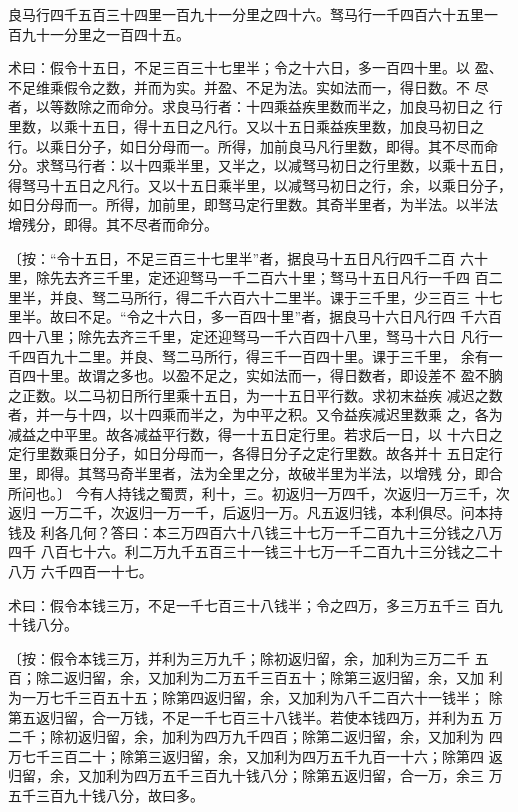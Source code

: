 \documentclass[12pt,UTF8]{ctexbook}
\begin{document}
良马行四千五百三十四里一百九十一分里之四十六。驽马行一千四百六十五里一 百九十一分里之一百四十五。

术曰：假令十五日，不足三百三十七里半；令之十六日，多一百四十里。以 盈、不足维乘假令之数，并而为实。并盈、不足为法。实如法而一，得日数。不 尽者，以等数除之而命分。求良马行者：十四乘益疾里数而半之，加良马初日之 行里数，以乘十五日，得十五日之凡行。又以十五日乘益疾里数，加良马初日之 行。以乘日分子，如日分母而一。所得，加前良马凡行里数，即得。其不尽而命 分。求驽马行者：以十四乘半里，又半之，以减驽马初日之行里数，以乘十五日， 得驽马十五日之凡行。又以十五日乘半里，以减驽马初日之行，余，以乘日分子， 如日分母而一。所得，加前里，即驽马定行里数。其奇半里者，为半法。以半法 增残分，即得。其不尽者而命分。

〔按：“令十五日，不足三百三十七里半”者，据良马十五日凡行四千二百 六十里，除先去齐三千里，定还迎驽马一千二百六十里；驽马十五日凡行一千四 百二里半，并良、驽二马所行，得二千六百六十二里半。课于三千里，少三百三 十七里半。故曰不足。“令之十六日，多一百四十里”者，据良马十六日凡行四 千六百四十八里；除先去齐三千里，定还迎驽马一千六百四十八里，驽马十六日 凡行一千四百九十二里。并良、驽二马所行，得三千一百四十里。课于三千里， 余有一百四十里。故谓之多也。以盈不足之，实如法而一，得日数者，即设差不 盈不朒之正数。以二马初日所行里乘十五日，为一十五日平行数。求初末益疾 减迟之数者，并一与十四，以十四乘而半之，为中平之积。又令益疾减迟里数乘 之，各为减益之中平里。故各减益平行数，得一十五日定行里。若求后一日，以 十六日之定行里数乘日分子，如日分母而一，各得日分子之定行里数。故各并十 五日定行里，即得。其驽马奇半里者，法为全里之分，故破半里为半法，以增残 分，即合所问也。〕 今有人持钱之蜀贾，利十，三。初返归一万四千，次返归一万三千，次返归 一万二千，次返归一万一千，后返归一万。凡五返归钱，本利俱尽。问本持钱及 利各几何？答曰：本三万四百六十八钱三十七万一千二百九十三分钱之八万四千 八百七十六。利二万九千五百三十一钱三十七万一千二百九十三分钱之二十八万 六千四百一十七。

术曰：假令本钱三万，不足一千七百三十八钱半；令之四万，多三万五千三 百九十钱八分。

〔按：假令本钱三万，并利为三万九千；除初返归留，余，加利为三万二千 五百；除二返归留，余，又加利为二万五千三百五十；除第三返归留，余，又加 利为一万七千三百五十五；除第四返归留，余，又加利为八千二百六十一钱半； 除第五返归留，合一万钱，不足一千七百三十八钱半。若使本钱四万，并利为五 万二千；除初返归留，余，加利为四万九千四百；除第二返归留，余，又加利为 四万七千三百二十；除第三返归留，余，又加利为四万五千九百一十六；除第四 返归留，余，又加利为四万五千三百九十钱八分；除第五返归留，合一万，余三 万五千三百九十钱八分，故曰多。
\end{document}
